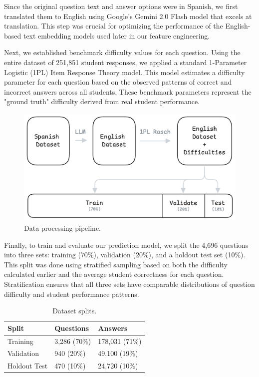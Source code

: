 \documentclass[
    a4paper, %
    10pt, %
    twoside, %
]{LTJournalArticle}
\begin{document}
Since the original question text and answer options were in Spanish, we first translated them to English using Google's Gemini 2.0 Flash model that excels at translation. This step was crucial for optimizing the performance of the English-based text embedding models used later in our feature engineering.

Next, we established benchmark difficulty values for each question. Using the entire dataset of 251,851 student responses, we applied a standard 1-Parameter Logistic (1PL) Item Response Theory model. This model estimates a difficulty parameter for each question based on the observed patterns of correct and incorrect answers across all students. These benchmark parameters represent the "ground truth" difficulty derived from real student performance.

\begin{figure}[H]
    \centering
    \includegraphics[width=0.8\columnwidth]{figures/data-pipeline.png}
    \caption{Data processing pipeline.}
    \label{fig:data-pipeline}
\end{figure}


Finally, to train and evaluate our prediction model, we split the 4,696 questions into three sets: training (70\%), validation (20\%), and a holdout test set (10\%). This split was done using stratified sampling based on both the difficulty calculated earlier and the average student correctness for each question. Stratification ensures that all three sets have comparable distributions of question difficulty and student performance patterns.

\begin{table}[H] %
    \centering
    \begin{tabular}{lll}
        \hline
        \textbf{Split} & \textbf{Questions} & \textbf{Answers} \\
        \hline
        Training & 3,286 (70\%) & 178,031 (71\%) \\
        Validation & 940 (20\%) & 49,100 (19\%) \\
        Holdout Test & 470 (10\%) & 24,720 (10\%) \\
        \hline
    \end{tabular}
    \caption{Dataset splits.}
    \label{tab:dataset-splits} %
\end{table}
\end{document}
